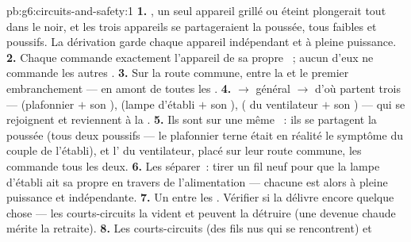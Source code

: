 \begin{solution}{pb:g6:circuits-and-safety:1}
\textbf{1.} , un seul appareil grillé ou éteint plongerait
tout dans le noir, et les trois appareils se partageraient la
poussée, tous faibles et poussifs. La dérivation garde chaque
appareil indépendant et à pleine puissance.
\textbf{2.} Chaque  commande exactement l'appareil de sa
propre ~; aucun d'eux ne commande les autres .
\textbf{3.} Sur la route commune, entre la  et le premier
embranchement --- en amont de toutes les .
\textbf{4.}  $\to$  général $\to$  d'où partent
trois  --- (plafonnier $+$ son ), (lampe
d'établi $+$ son ), ( du ventilateur $+$ son
) --- qui se rejoignent et reviennent à la .
\textbf{5.} Ils sont  sur une même ~: ils se
partagent la poussée (tous deux poussifs --- le plafonnier terne
était en réalité le symptôme du couple de l'établi), et
l' du ventilateur, placé sur leur route commune, les
commande tous les deux.
\textbf{6.} Les séparer~: tirer un fil neuf pour que la lampe
d'établi ait sa propre  en travers de l'alimentation ---
chacune est alors à pleine puissance et indépendante.
\textbf{7.} Un  entre les . Vérifier si la 
délivre encore quelque chose --- les courts-circuits la vident et
peuvent la détruire (une  devenue chaude mérite la retraite).
\textbf{8.} Les courts-circuits (des fils nus qui se rencontrent) et

\end{solution}
